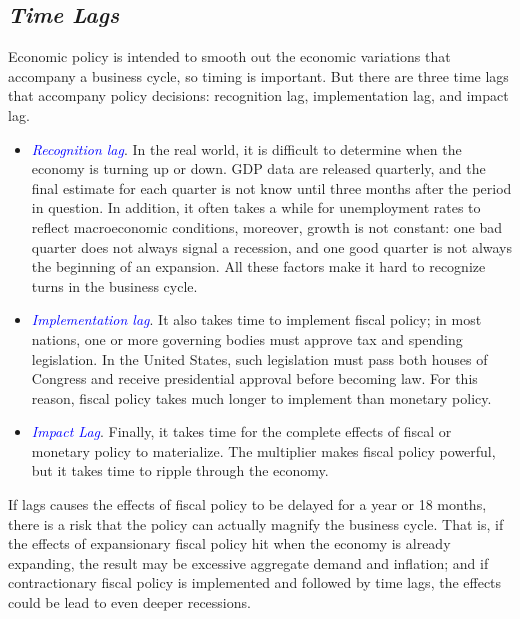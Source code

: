 \documentclass[11pt]{article} %
\begin{document}
\subsection*{\textit{\textbf{Time Lags}}}
Economic policy is intended to smooth out the economic variations that accompany a business cycle, so timing is important. But there are three time lags that accompany policy decisions: recognition lag, implementation lag, and impact lag.
\begin{itemize}
\item \textit{\textcolor{blue}{Recognition lag}}. In the real world, it is difficult to determine when the economy is turning up or down. GDP data are released quarterly, and the final estimate for each quarter is not know until three months after the period in question. In addition, it often takes a while for unemployment rates to reflect macroeconomic conditions, moreover, growth is not constant: one bad quarter does not always signal a recession, and one good quarter is not always the beginning of an expansion. All these factors make it hard to recognize turns in the business cycle.
\item \textit{\textcolor{blue}{Implementation lag}}. It also takes time to implement fiscal policy; in most nations, one or more governing bodies must approve tax and spending legislation. In the United States, such legislation must pass both houses of Congress and receive presidential approval before becoming law. For this reason, fiscal policy takes much longer to implement than monetary policy.
\item \textit{\textcolor{blue}{Impact Lag}}. Finally, it takes time for the complete effects of fiscal or monetary policy to materialize. The multiplier makes fiscal policy powerful, but it takes time to ripple through the economy.
\end{itemize}

If lags causes the effects of fiscal policy to be delayed for a year or 18 months, there is a risk that the policy can actually magnify the business cycle. That is, if the effects of expansionary fiscal policy hit when the economy is already expanding, the result may be excessive aggregate demand and inflation; and if contractionary fiscal policy is implemented and followed by time lags, the effects could be lead to even deeper recessions.
\end{document}
